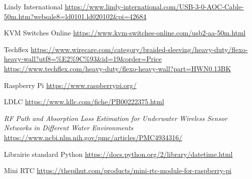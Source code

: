 \begin{thebibliographyUL}{9}
 Lindy International \url{https://www.lindy-international.com/USB-3-0-AOC-Cable-50m.htm?websale8=ld0101.ld020102&pi=42684}

 KVM Switches Online \url{https://www.kvm-switches-online.com/usb2-aa-50m.html}

 Techflex \url{https://www.wirecare.com/category/braided-sleeving/heavy-duty/flexo-heavy-wall?utf8=\%E2\%9C\%93&id=19&order=Price} \url{https://www.techflex.com/heavy-duty/flexo-heavy-wall?part=HWN0.13BK}

 Raspberry Pi \url{https://www.raspberrypi.org/}

 LDLC \url{https://www.ldlc.com/fiche/PB00222375.html}

 \emph{RF Path and Absorption Loss Estimation for Underwater Wireless Sensor Networks in Different Water Environments} \url{https://www.ncbi.nlm.nih.gov/pmc/articles/PMC4934316/}

 Librairie standard Python \url{https://docs.python.org/2/library/datetime.html}

 Mini RTC \url{https://thepihut.com/products/mini-rtc-module-for-raspberry-pi}


\end{thebibliographyUL}